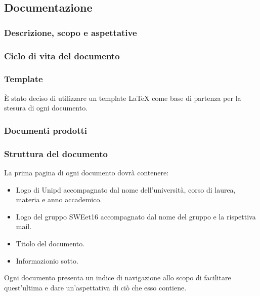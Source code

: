 \subsection{Documentazione}

\subsubsection{Descrizione, scopo e aspettative}

\subsubsection{Ciclo di vita del documento}

\subsubsection{Template}
È stato deciso di utilizzare un template LaTeX %
come base di partenza per la stesura di ogni documento.

\subsubsection{Documenti prodotti}



\subsubsection{Struttura del documento}

        La prima pagina di ogni documento dovrà contenere:
        \begin{itemize}
          \item Logo di Unipd accompagnato dal nome dell'università, corso di laurea, materia e anno accademico.
          \item Logo del gruppo SWEet16 accompagnato dal nome del gruppo e la rispettiva mail.
          \item Titolo del documento.
          \item Informazionio sotto. %
        \end{itemize}


        Ogni documento presenta un indice di navigazione allo scopo di facilitare quest'ultima e
        dare un'aspettativa di ciò che esso contiene.

